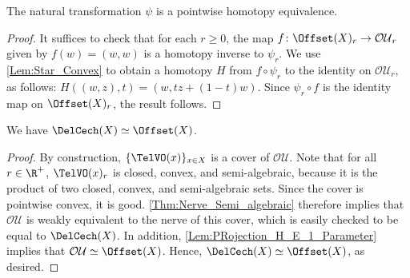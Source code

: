 %
\begin{lemma}\label{Lem:PRojection_H_E_1_Parameter}
The natural transformation $\psi$ is a pointwise homotopy equivalence.
\end{lemma}
%
\begin{proof}
It suffices to check that for each $r\geq 0$, the map $f\colon  \Offset(X)_r\to \mathcal{OU}_r$ given by $f(w)=(w,w)$ is a homotopy inverse to $\psi_r$.   We use \cref{Lem:Star_Convex} to obtain a homotopy $H$ from $f\circ \psi_r$ to the identity on $\mathcal{OU}_r$, as follows: $H((w,z),t)=(w,tz+(1-t)w)$.  Since $\psi_r\circ f$ is the identity map on $\Offset(X)_r$, the result follows.
\end{proof}
%
\begin{theorem}\label{Thm:1_Param_Weak_Equiv}
We have $\DelCech(X)\simeq \Offset(X)$.
\end{theorem}
\begin{proof}
By construction,  $\{\TelVO(x)\}_{x\in X}$ is a cover of $\mathcal{OU}$.  Note that for all $r\in \R^{+}$, $\TelVO(x)_r$ is closed, convex, and semi-algebraic, because it is the product of two closed, convex, and semi-algebraic sets.  Since the cover is pointwise convex, it is good. \cref{Thm:Nerve_Semi_algebraic} therefore implies that $\mathcal{OU}$ is weakly equivalent to the nerve of this cover, which is easily checked to be equal to $\DelCech(X)$.  In addition, \cref{Lem:PRojection_H_E_1_Parameter} implies that $\mathcal{OU} \simeq \Offset(X)$.  Hence, $\DelCech(X)\simeq\Offset(X)$, as desired.
\end{proof}
%
